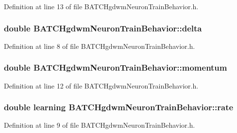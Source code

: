 Definition at line 13 of file BATCHgdwmNeuronTrainBehavior.h.

\hypertarget{class_b_a_t_c_hgdwm_neuron_train_behavior_a68dcc956fa80cfa014543bbc2567fd97}{
\subsubsection[{delta}]{\setlength{\rightskip}{0pt plus 5cm}double {\bf BATCHgdwmNeuronTrainBehavior::delta}}}
\label{class_b_a_t_c_hgdwm_neuron_train_behavior_a68dcc956fa80cfa014543bbc2567fd97}


Definition at line 8 of file BATCHgdwmNeuronTrainBehavior.h.

\hypertarget{class_b_a_t_c_hgdwm_neuron_train_behavior_ae58617ea1ae40624e9bae3441fb36bc8}{
\subsubsection[{momentum}]{\setlength{\rightskip}{0pt plus 5cm}double {\bf BATCHgdwmNeuronTrainBehavior::momentum}}}
\label{class_b_a_t_c_hgdwm_neuron_train_behavior_ae58617ea1ae40624e9bae3441fb36bc8}


Definition at line 12 of file BATCHgdwmNeuronTrainBehavior.h.

\hypertarget{class_b_a_t_c_hgdwm_neuron_train_behavior_add4587d6689b8a8f8478058578c88c3a}{
\subsubsection[{rate}]{\setlength{\rightskip}{0pt plus 5cm}double learning {\bf BATCHgdwmNeuronTrainBehavior::rate}}}
\label{class_b_a_t_c_hgdwm_neuron_train_behavior_add4587d6689b8a8f8478058578c88c3a}


Definition at line 9 of file BATCHgdwmNeuronTrainBehavior.h.

